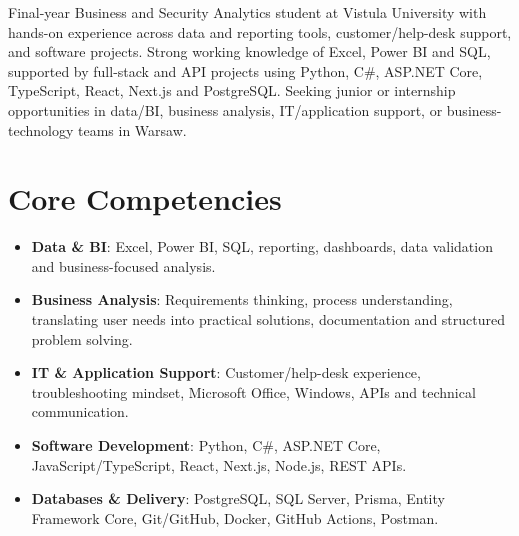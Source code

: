 \documentclass[11pt,a4paper,sans]{moderncv}
\begin{document}
\makecvtitle

\vspace{4pt}
\small{Final-year Business and Security Analytics student at Vistula University with hands-on experience across data and reporting tools, customer/help-desk support, and software projects. Strong working knowledge of Excel, Power BI and SQL, supported by full-stack and API projects using Python, C\#, ASP.NET Core, TypeScript, React, Next.js and PostgreSQL. Seeking junior or internship opportunities in data/BI, business analysis, IT/application support, or business-technology teams in Warsaw.}

\section{Core Competencies}
\vspace{1pt}
\begin{itemize}
\item \textbf{Data \& BI}: Excel, Power BI, SQL, reporting, dashboards, data validation and business-focused analysis.
\item \textbf{Business Analysis}: Requirements thinking, process understanding, translating user needs into practical solutions, documentation and structured problem solving.
\item \textbf{IT \& Application Support}: Customer/help-desk experience, troubleshooting mindset, Microsoft Office, Windows, APIs and technical communication.
\item \textbf{Software Development}: Python, C\#, ASP.NET Core, JavaScript/TypeScript, React, Next.js, Node.js, REST APIs.
\item \textbf{Databases \& Delivery}: PostgreSQL, SQL Server, Prisma, Entity Framework Core, Git/GitHub, Docker, GitHub Actions, Postman.
\end{itemize}
\end{document}
